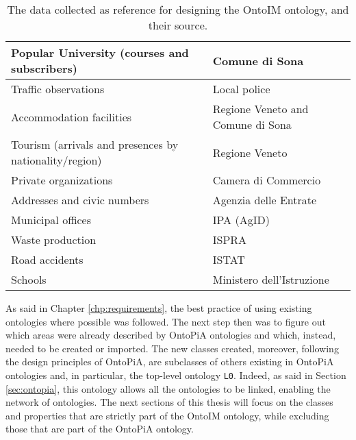 \begin{table}[!ht]
\begin{tabular}{|p{}|p{}|}
  Popular University (courses and subscribers)                                                                        & Comune di Sona                    \\ \hline
  Traffic observations                                                                                                & Local police                      \\ \hline
  Accommodation facilities                                                                                            & Regione Veneto and Comune di Sona \\ \hline
  Tourism (arrivals and presences by nationality/region)                                                                                                             & Regione Veneto                    \\ \hline
  Private organizations                                                                                               & Camera di Commercio               \\ \hline
  Addresses and civic numbers                                                                                         & Agenzia delle Entrate             \\ \hline
  Municipal offices                                                                                                   & IPA (\ac{AgID})                        \\ \hline
  Waste production                                                                                                    & ISPRA                             \\ \hline
  Road accidents                                                                                                      & ISTAT                             \\ \hline
  Schools                                                                                                             & Ministero dell'Istruzione         \\ \hline
  \end{tabular}
  \caption{The data collected as reference for designing the OntoIM ontology, and their source.}
  \label{tab:data-and-source}
\end{table}

As said in Chapter \ref{chp:requirements}, the best practice of using existing ontologies where possible was followed. The next step then was to figure out which areas were already described by OntoPiA ontologies and which, instead, needed to be created or imported. The new classes created, moreover, following the design principles of OntoPiA, are subclasses of others existing in OntoPiA ontologies and, in particular, the top-level ontology \verb#L0#. Indeed, as said in Section \ref{sec:ontopia}, this ontology allows all the
ontologies to be linked, enabling the network of ontologies. The next sections of this thesis will focus on the classes and properties that are strictly part of the \ac{OntoIM} ontology, while excluding those that are part of the OntoPiA ontology.

